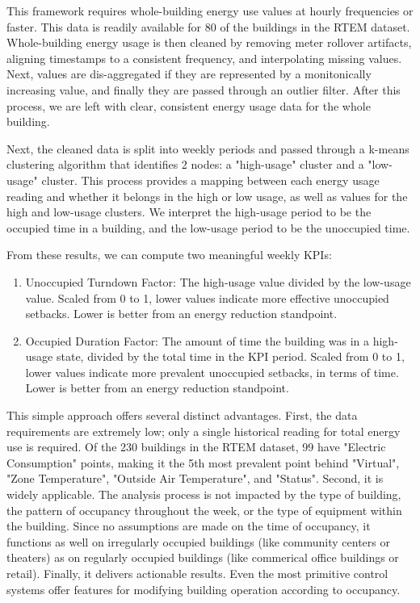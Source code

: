 \documentclass[a4paper]{article}
\begin{document}
This framework requires whole-building energy use values at hourly frequencies or faster. This data is readily available for 80 of the buildings in the RTEM dataset. Whole-building energy usage is then cleaned by removing meter rollover artifacts, aligning timestamps to a consistent frequency, and interpolating missing values. Next, values are dis-aggregated if they are represented by a monitonically increasing value, and finally they are passed through an outlier filter. After this process, we are left with clear, consistent energy usage data for the whole building.

Next, the cleaned data is split into weekly periods and passed through a k-means clustering algorithm that identifies 2 nodes: a "high-usage" cluster and a "low-usage" cluster. This process provides a mapping between each energy usage reading and whether it belongs in the high or low usage, as well as values for the high and low-usage clusters. We interpret the high-usage period to be the occupied time in a building, and the low-usage period to be the unoccupied time.

From these results, we can compute two meaningful weekly KPIs:
\begin{enumerate}
\item{Unoccupied Turndown Factor: The high-usage value divided by the low-usage value. Scaled from 0 to 1, lower values indicate more effective unoccupied setbacks. Lower is better from an energy reduction standpoint.}
\item{Occupied Duration Factor: The amount of time the building was in a high-usage state, divided by the total time in the KPI period. Scaled from 0 to 1, lower values indicate more prevalent unoccupied setbacks, in terms of time.  Lower is better from an energy reduction standpoint.}
\end{enumerate}

This simple approach offers several distinct advantages. First, the data requirements are extremely low; only a single historical reading for total energy use is required. Of the 230 buildings in the RTEM dataset, 99 have "Electric Consumption" points, making it the 5th most prevalent point behind "Virtual", "Zone Temperature", "Outside Air Temperature", and "Status". Second, it is widely applicable. The analysis process is not impacted by the type of building, the pattern of occupancy throughout the week, or the type of equipment within the building. Since no assumptions are made on the time of occupancy, it functions as well on irregularly occupied buildings (like community centers or theaters) as on regularly occupied buildings (like commerical office buildings or retail). Finally, it delivers actionable results. Even the most primitive control systems offer features for modifying building operation according to occupancy.
\end{document}
